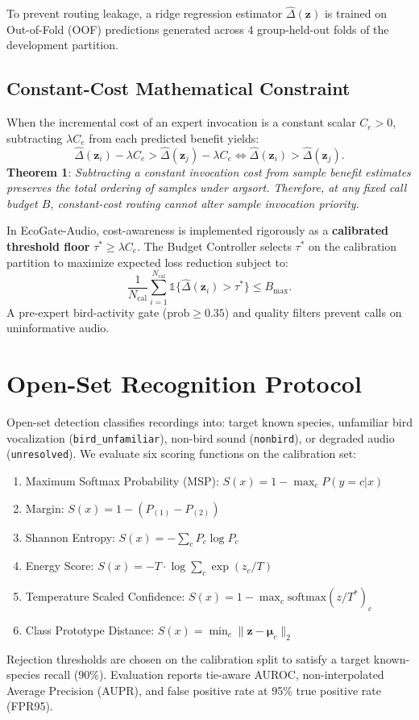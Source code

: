 \documentclass[11pt,a4paper]{article}
\begin{document}
To prevent routing leakage, a ridge regression estimator $\widehat{\Delta}(\mathbf{z})$ is trained on Out-of-Fold (OOF) predictions generated across 4 group-held-out folds of the development partition.

\subsection{Constant-Cost Mathematical Constraint}
When the incremental cost of an expert invocation is a constant scalar $C_e > 0$, subtracting $\lambda C_e$ from each predicted benefit yields:
\begin{equation}
\widehat{\Delta}(\mathbf{z}_i) - \lambda C_e > \widehat{\Delta}(\mathbf{z}_j) - \lambda C_e \iff \widehat{\Delta}(\mathbf{z}_i) > \widehat{\Delta}(\mathbf{z}_j).
\end{equation}
\textbf{Theorem 1}: \textit{Subtracting a constant invocation cost from sample benefit estimates preserves the total ordering of samples under argsort. Therefore, at any fixed call budget $B$, constant-cost routing cannot alter sample invocation priority.}

In EcoGate-Audio, cost-awareness is implemented rigorously as a \textbf{calibrated threshold floor} $\tau^* \ge \lambda C_e$. The Budget Controller selects $\tau^*$ on the calibration partition to maximize expected loss reduction subject to:
\begin{equation}
\frac{1}{N_{\text{cal}}} \sum_{i=1}^{N_{\text{cal}}} \mathbb{1}\{\widehat{\Delta}(\mathbf{z}_i) > \tau^*\} \le B_{\text{max}}.
\end{equation}
A pre-expert bird-activity gate ($\text{prob} \ge 0.35$) and quality filters prevent calls on uninformative audio.

\section{Open-Set Recognition Protocol}
Open-set detection classifies recordings into: target known species, unfamiliar bird vocalization (\texttt{bird\_unfamiliar}), non-bird sound (\texttt{nonbird}), or degraded audio (\texttt{unresolved}). We evaluate six scoring functions on the calibration set:
\begin{enumerate}
    \item Maximum Softmax Probability (MSP): $S(x) = 1 - \max_c P(y=c|x)$
    \item Margin: $S(x) = 1 - (P_{(1)} - P_{(2)})$
    \item Shannon Entropy: $S(x) = -\sum_c P_c \log P_c$
    \item Energy Score: $S(x) = -T \cdot \log \sum_c \exp(z_c / T)$
    \item Temperature Scaled Confidence: $S(x) = 1 - \max_c \text{softmax}(z / T^*)_c$
    \item Class Prototype Distance: $S(x) = \min_c \|\mathbf{z} - \boldsymbol{\mu}_c\|_2$
\end{enumerate}
Rejection thresholds are chosen on the calibration split to satisfy a target known-species recall ($90\%$). Evaluation reports tie-aware AUROC, non-interpolated Average Precision (AUPR), and false positive rate at 95\% true positive rate (FPR95).
\end{document}
